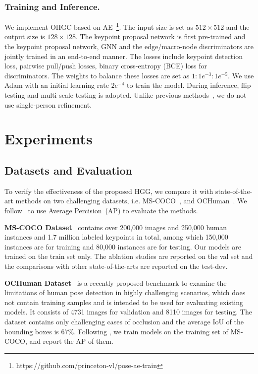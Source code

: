 \documentclass[runningheads]{llncs}
\begin{document}
	
	\subsubsection{Training and Inference.} 
	We implement OHGC based on AE~\cite{newell2017associative}\footnote{https://github.com/princeton-vl/pose-ae-train}. The input size is set as $512 \times 512$ and the output size is $128 \times 128$. The keypoint proposal network is first pre-trained and the keypoint proposal network, GNN and the edge/macro-node discriminators are jointly trained in an end-to-end manner. The losses include keypoint detection loss, pairwise pull/push losses, binary cross-entropy (BCE) loss for discriminators. The weights to balance these losses are set as $1:1e^{-3}:1e^{-5}$. We use Adam with an initial learning rate $2e^{-4}$ to train the model. During inference, flip testing and multi-scale testing is adopted. Unlike previous methods~\cite{cao2017realtime,newell2017associative}, we do not use single-person refinement. 
	
	
	\section{Experiments}
	\label{sec:exp}
	
	\subsection{Datasets and Evaluation}
	To verify the effectiveness of the proposed HGG, we compare it with state-of-the-art methods on two challenging datasets, i.e. MS-COCO~\cite{lin2014microsoft}, and OCHuman~\cite{zhang2019pose2seg}. We follow~\cite{andriluka2017posetrack} to use Average Percision~(AP) to evaluate the methods.
	
	\textbf{MS-COCO Dataset}~\cite{lin2014microsoft} contains over 200,000 images and 250,000 human instances and 1.7 million labeled keypoints in total, among which 150,000 instances are for training and 80,000 instances are for testing. Our models are trained on the train set only. The ablation studies are reported on the val set and the comparisons with other state-of-the-arts are reported on the test-dev. 
	
	
	\textbf{OCHuman Dataset}~\cite{zhang2019pose2seg} is a recently proposed benchmark to examine the limitations of human pose detection in highly challenging scenarios, which does not contain training samples and is intended to be used for evaluating existing models. It consists of 4731 images for validation and 8110 images for testing. The dataset contains only challenging cases of occlusion and the average IoU of the bounding boxes is 67\%. Following \cite{zhang2019pose2seg}, we train models on the training set of MS-COCO, and report the AP of them.
	
\end{document}
